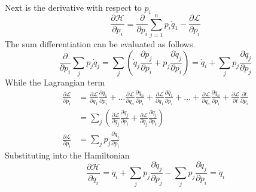 \documentclass[../../../main.tex]{subfiles}
\begin{document}
Next is the derivative with respect to $p_i$
\begin{equation*}
	\frac{\partial \mathcal{H}}{\partial p_i}=\frac{\partial}{\partial p_i}\sum_{j=1}^{n}p_i\dot{q}_1-\frac{\partial \mathcal{L}}{\partial p_i}
\end{equation*}
The sum differentiation can be evaluated as follows
\begin{equation*}
	\frac{\partial}{\partial p_i}\sum_{j}p_j\dot{q}_j=\sum_j\left(\dot{q}_j\frac{\partial p_j}{\partial p_i}+p_j\frac{\partial\dot{q}_j}{\partial p_i}\right)=\dot{q}_i+\sum_jp_j\frac{\partial \dot{q}_j}{\partial p_j}
\end{equation*}
While the Lagrangian term
\begin{align*}
	\frac{\partial \mathcal{L}}{\partial p_i} & =\frac{\partial \mathcal{L}}{\partial q_1}\frac{\partial q_1}{\partial p_i}+\dots\frac{\partial\mathcal{L}}{\partial q_n}\frac{\partial q_n}{\partial p_i}+\frac{\partial\mathcal{L}}{\partial \dot{q}_1}\frac{\partial\dot{q}_1}{\partial p_i}+\dots+\frac{\partial \mathcal{L}}{\partial \dot{q}_n}\frac{\partial \dot{q}_n}{\partial p_i}+\frac{\partial\mathcal{L}}{\partial t}\frac{\partial t}{\partial p_i} \\
	                                          & =\sum_j\left(\frac{\partial\mathcal{L}}{\partial q_j}\frac{\partial q_j}{\partial p_i}+\frac{\partial\mathcal{L}}{\partial \dot{q}_j}\frac{\partial \dot{q}_j}{\partial p_i}\right)                                                                                                                                                                                                                                \\
	\frac{\partial \mathcal{L}}{\partial p_i} & =\sum_jp_j\frac{\partial \dot{q}_j}{\partial p_i}
\end{align*}
Substituting into the Hamiltonian
\begin{equation*}
	\frac{\partial \mathcal{H}}{\partial q_i}=\dot{q}_i+\sum_jp_j\frac{\partial \dot{q}_j}{\partial p_j}-\sum_jp_j\frac{\partial \dot{q}_j}{\partial p_i}=\dot{q}_i
\end{equation*}
\end{document}
